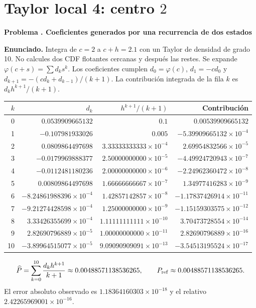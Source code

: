 \documentclass[11pt,a4paper]{article}
\theoremstyle{definition}
\newcounter{problema}
\newenvironment{resuelto}[1]{\refstepcounter{problema}\par\medskip\Needspace{6\baselineskip}\textbf{Problema \theproblema. #1}\par}{\par\medskip}
\begin{document}
\section{\texorpdfstring{Taylor local 4: centro $2$}{Taylor local 4: centro 2}}
\begin{resuelto}{Coeficientes generados por una recurrencia de dos estados}
\textbf{Enunciado.} Integra de $c=2$ a $c+h=2.1$ con un Taylor de densidad de grado 10. No calcules dos CDF flotantes cercanas y después las restes.
Se expande $\varphi(c+s)=\sum d_ks^k$. Los coeficientes cumplen $d_0=\varphi(c)$, $d_1=-cd_0$ y $d_{k+1}=-(cd_k+d_{k-1})/(k+1)$. La contribución integrada de la fila $k$ es $d_kh^{k+1}/(k+1)$.

\begin{center}\small\begin{tabular}{rrrr}
\toprule
$k$&$d_k$&$h^{k+1}/(k+1)$&Contribución\\
\midrule
0&$0.0539909665132$&$0.1$&$0.00539909665132$\\
1&$-0.107981933026$&$0.005$&$-5.39909665132\times10^{-4}$\\
2&$0.0809864497698$&$3.33333333333\times10^{-4}$&$2.69954832566\times10^{-5}$\\
3&$-0.0179969888377$&$2.50000000000\times10^{-5}$&$-4.49924720943\times10^{-7}$\\
4&$-0.0112481180236$&$2.00000000000\times10^{-6}$&$-2.24962360472\times10^{-8}$\\
5&$0.00809864497698$&$1.66666666667\times10^{-7}$&$1.34977416283\times10^{-9}$\\
6&$-8.24861988396\times10^{-4}$&$1.42857142857\times10^{-8}$&$-1.17837426914\times10^{-11}$\\
7&$-9.21274428598\times10^{-4}$&$1.25000000000\times10^{-9}$&$-1.15159303575\times10^{-12}$\\
8&$3.33426355699\times10^{-4}$&$1.11111111111\times10^{-10}$&$3.70473728554\times10^{-14}$\\
9&$2.82690796889\times10^{-5}$&$1.00000000000\times10^{-11}$&$2.82690796889\times10^{-16}$\\
10&$-3.89964515077\times10^{-5}$&$9.09090909091\times10^{-13}$&$-3.54513195524\times10^{-17}$\\
\bottomrule\end{tabular}\end{center}
\[
\widehat P=\sum_{k=0}^{10}\frac{d_kh^{k+1}}{k+1}\approx0.00488571138536265,\qquad P_{\rm ref}\approx0.00488571138536265.
\]
El error absoluto observado es $1.18364160303\times10^{-18}$ y el relativo $2.42265969001\times10^{-16}$.

\end{resuelto}
\end{document}
